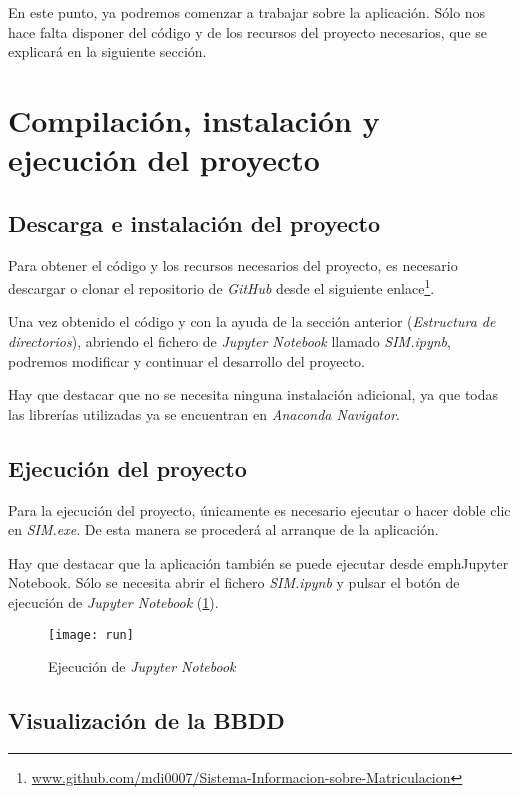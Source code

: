 En este punto, ya podremos comenzar a trabajar sobre la aplicación. Sólo nos hace falta disponer del código y de los recursos del proyecto necesarios, que se explicará en la siguiente sección.




\section{Compilación, instalación y ejecución del proyecto}

\subsection{Descarga  e instalación del proyecto}
Para obtener el código y los recursos necesarios del proyecto, es necesario descargar o clonar el repositorio de \emph{GitHub} desde el siguiente enlace\footnote{\href {https://github.com/mdi0007/Sistema-Informacion-sobre-Matriculacion}{www.github.com/mdi0007/Sistema-Informacion-sobre-Matriculacion}}. 

Una vez obtenido el código y con la ayuda de la sección anterior (\emph{Estructura de directorios}), abriendo el fichero de \emph{Jupyter Notebook} llamado \emph{SIM.ipynb}, podremos modificar y continuar el desarrollo del proyecto.

Hay que destacar que no se necesita ninguna instalación adicional, ya que todas las librerías utilizadas ya se encuentran en 
\emph{Anaconda Navigator}.

\subsection{Ejecución del proyecto}

Para la ejecución del proyecto, únicamente es necesario ejecutar o hacer doble clic en \emph{SIM.exe}. De esta manera se procederá al arranque de la aplicación.

Hay que destacar que la aplicación también se puede ejecutar desde emph{Jupyter Notebook}. Sólo se necesita abrir el fichero \emph{SIM.ipynb} y pulsar el botón de ejecución de \emph{Jupyter Notebook} (\ref{fig:run}).

\begin{figure}%
		\centering
		\texttt{[image: run]}
		\caption{Ejecución de \emph{Jupyter Notebook}}\label{fig:run}
	\end{figure} 

\subsection{Visualización de la BBDD}

